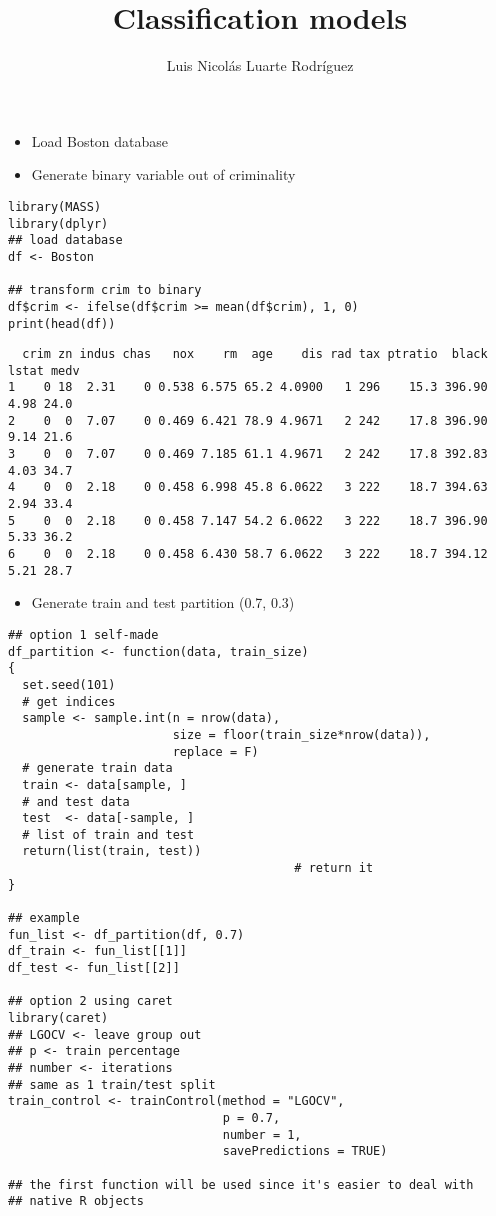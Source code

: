 \documentclass[11pt]{article}
\author{Luis Nicolás Luarte Rodríguez}
\date{}
\title{Classification models}
\begin{document}
\maketitle
\begin{itemize}
\item Load Boston database
\item Generate binary variable out of criminality
\end{itemize}
\begin{verbatim}
library(MASS)
library(dplyr)
## load database
df <- Boston

## transform crim to binary
df$crim <- ifelse(df$crim >= mean(df$crim), 1, 0)
print(head(df))
\end{verbatim}

\begin{verbatim}
  crim zn indus chas   nox    rm  age    dis rad tax ptratio  black lstat medv
1    0 18  2.31    0 0.538 6.575 65.2 4.0900   1 296    15.3 396.90  4.98 24.0
2    0  0  7.07    0 0.469 6.421 78.9 4.9671   2 242    17.8 396.90  9.14 21.6
3    0  0  7.07    0 0.469 7.185 61.1 4.9671   2 242    17.8 392.83  4.03 34.7
4    0  0  2.18    0 0.458 6.998 45.8 6.0622   3 222    18.7 394.63  2.94 33.4
5    0  0  2.18    0 0.458 7.147 54.2 6.0622   3 222    18.7 396.90  5.33 36.2
6    0  0  2.18    0 0.458 6.430 58.7 6.0622   3 222    18.7 394.12  5.21 28.7
\end{verbatim}


\begin{itemize}
\item Generate train and test partition (0.7, 0.3)
\end{itemize}
\begin{verbatim}
## option 1 self-made
df_partition <- function(data, train_size)
{
  set.seed(101)
  # get indices
  sample <- sample.int(n = nrow(data),
                       size = floor(train_size*nrow(data)),
                       replace = F)
  # generate train data
  train <- data[sample, ]
  # and test data
  test  <- data[-sample, ]
  # list of train and test
  return(list(train, test))
                                        # return it
}

## example
fun_list <- df_partition(df, 0.7)
df_train <- fun_list[[1]]
df_test <- fun_list[[2]]

## option 2 using caret
library(caret)
## LGOCV <- leave group out
## p <- train percentage
## number <- iterations
## same as 1 train/test split
train_control <- trainControl(method = "LGOCV",
                              p = 0.7,
                              number = 1,
                              savePredictions = TRUE)

## the first function will be used since it's easier to deal with
## native R objects
\end{verbatim}
\end{document}
